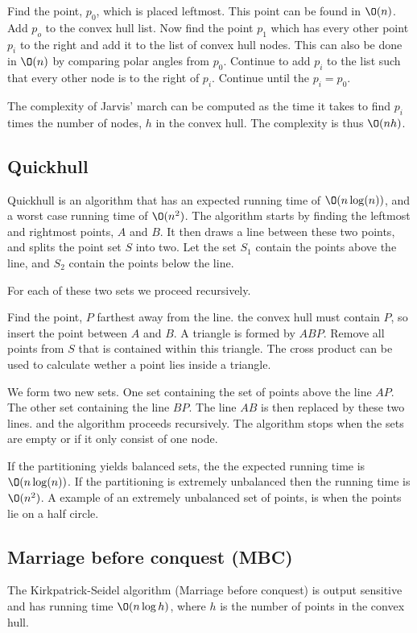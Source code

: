 \documentclass[10pt]{article}
\begin{document}
Find the point, $p_0$, which is placed leftmost. This point can be found in $\O(n)$. Add $p_o$ to the convex hull list. Now find the point $p_1$ which has every other point $p_i$ to the right and add it to the list of convex hull nodes. This can also be done in $\O(n)$ by comparing polar angles from $p_0$. Continue to add $p_i$ to the list such that every other node is to the right of $p_i$. Continue until the $p_i=p_0$.

The complexity of Jarvis' march can be computed as the time it takes to find $p_i$ times the number of nodes, $h$ in the convex hull. The complexity is thus $\O(nh)$.


\subsection{Quickhull} %
\label{sub:quickhull}
Quickhull is an algorithm that has an expected running time of $\O(n\log(n))$, and a worst case running time of $\O(n^2)$. The algorithm starts by finding the leftmost and rightmost points, $A$ and $B$. It then draws a line between these two points, and splits the point set $S$ into two. Let the set $S_1$ contain the points above the line, and $S_2$ contain the points below the line. 

For each of these two sets we proceed recursively.

Find the point, $P$ farthest away from the line. the convex hull must contain $P$, so insert the point between $A$ and $B$. A triangle is formed by $ABP$. Remove all points from $S$ that is contained within this triangle. The cross product can be used to calculate wether a point lies inside a triangle.                                                                                        

We form two new sets. One set containing the set of points above the line $AP$. The other set containing the line $BP$. The line $AB$ is then replaced by these two lines. and the algorithm proceeds recursively. The algorithm stops when the sets are empty or if it only consist of one node.

If the partitioning yields balanced sets, the the expected running time is $\O(n\log(n))$. If the partitioning is extremely unbalanced then the running time is $\O(n^2)$. A example of an extremely unbalanced set of points, is when the points lie on a half circle.



\subsection{Marriage before conquest (MBC)} %
\label{sub:marriage_before_conquest_mbc_}
The Kirkpatrick-Seidel algorithm (Marriage before conquest) is output sensitive and has running time $\O(n\log{h})$, where $h$ is the number of points in the convex hull.
\end{document}
